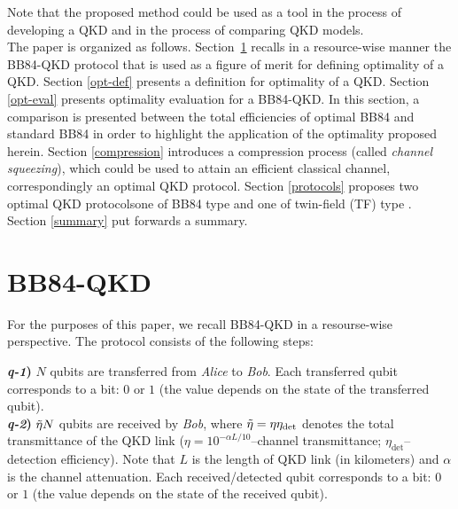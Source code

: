 \documentclass[journal,onecolumn]{IEEEtran}
\theoremstyle{thmstyleone}%
\theoremstyle{thmstyletwo}%
\theoremstyle{thmstylethree}%
\begin{document}
	Note that the proposed method could be used as a tool in the process of developing a QKD and in the process of comparing QKD models.\\
	\indent The paper is organized as follows. Section~\ref{bb84-steps} recalls in a resource-wise manner the BB84-QKD protocol that is used as a figure of merit for defining optimality of a QKD. Section \ref{opt-def} presents a definition for optimality of a QKD. Section \ref{opt-eval} presents optimality evaluation for a BB84-QKD. In this section, a comparison is presented between the total efficiencies of optimal BB84 and standard BB84 in order to highlight the application of the optimality proposed herein. Section \ref{compression} introduces a compression process (called \textit{channel squeezing}), which could be used to attain an efficient classical channel, correspondingly an optimal QKD protocol. Section \ref{protocols} proposes two optimal QKD protocols\textemdash one of BB84 type \cite{Bennett1984} and one of twin-field (TF) type \cite{Lucamarini2018,Curty2019}. Section \ref{summary} put forwards a summary.
	
	
	
	\section{BB84-QKD}\label{bb84-steps}
	For the purposes of this paper, we recall BB84-QKD in a resourse-wise perspective. The protocol consists of the following steps:\\
	
	
	
	\begin{tcolorbox}[colback=yellow!5,colframe=yellow!40!black,title=\textsc{Qubit transfer}]
		\textbf{\textit{q-1})} $N$ qubits are transferred from \textit{Alice} to \textit{Bob}. Each transferred qubit corresponds to a bit: $0$ or $1$ (the value depends on the state of the transferred qubit).\\
		\textbf{\textit{q-2})} $\Tilde{\eta}N$ qubits are received by \textit{Bob}, where $\Tilde{\eta}=\eta\eta_{\text{det}}$ denotes the total transmittance of the QKD link ($\eta=10^{-\alpha L/10}$--channel transmittance; $\eta_{\text{det}}$--detection efficiency). Note that $L$ is the length of QKD link (in kilometers) and $\alpha$ is the channel attenuation. Each received/detected qubit corresponds to a bit: $0$ or $1$ (the value depends on the state of the received qubit).\\
	\end{tcolorbox}
	
\end{document}
